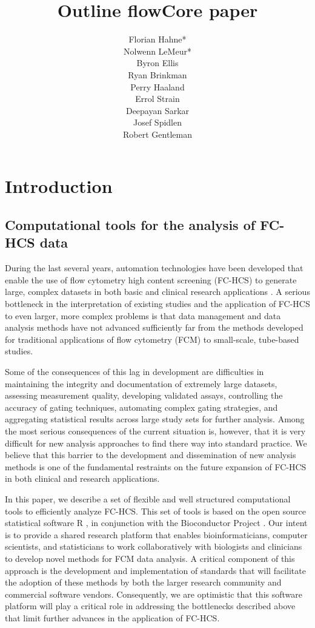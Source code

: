 \documentclass[12pt]{article}
\title{Outline flowCore paper}
\author{Florian Hahne*\\
  Nolwenn LeMeur*\\
  Byron Ellis\\
  Ryan Brinkman\\
  Perry Haaland\\
  Errol Strain\\
  Deepayan Sarkar\\
  Josef Spidlen\\
  Robert Gentleman
 }
\begin{document}
\maketitle

\section*{Introduction}
\subsection*{Computational tools for the analysis of FC-HCS data}
During the last several years, automation technologies have been
developed that enable the use of flow cytometry high content screening
(FC-HCS) to generate large, complex datasets in both basic and
clinical research applications \citep{brinkman2007hcf}. A serious
bottleneck in the interpretation of existing studies and the
application of FC-HCS to even larger, more complex problems is that
data management and data analysis methods have not advanced
sufficiently far from the methods developed for traditional
applications of flow cytometry (FCM) to small-scale, tube-based
studies.

Some of the consequences of this lag in development are difficulties
in maintaining the integrity and documentation of extremely large
datasets, assessing measurement quality, developing validated assays,
controlling the accuracy of gating techniques, automating complex gating
strategies, and aggregating statistical results across large study
sets for further analysis.  Among the most serious consequences of the
current situation is, however, that it is very difficult for new
analysis approaches to find there way into standard practice. We
believe that this barrier to the development and dissemination of new
analysis methods is one of the fundamental restraints on the future
expansion of FC-HCS in both clinical and research applications.

In this paper, we describe a set of flexible and well structured
computational tools to efficiently analyze FC-HCS. This set of tools
is based on the open source statistical software R \citep{Rmain}, in
conjunction with the Bioconductor Project \citep{BIOC}. Our intent is
to provide a shared research platform that enables bioinformaticians,
computer scientists, and statisticians to work collaboratively with
biologists and clinicians to develop novel methods
\citep{lizard2007fca} for FCM data analysis. A critical component of
this approach is the development and implementation of standards that
will facilitate the adoption of these methods by both the larger
research community and commercial software vendors.  Consequently, we
are optimistic that this software platform will play a critical role
in addressing the bottlenecks described above that limit further
advances in the application of FC-HCS.
\end{document}

